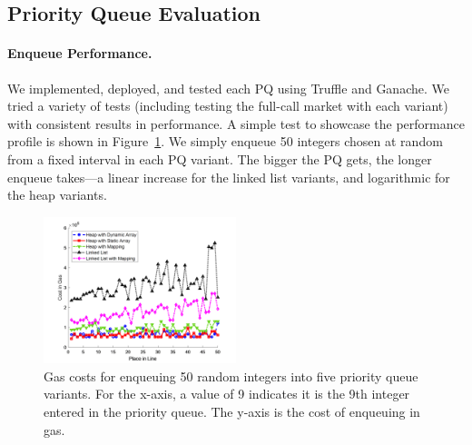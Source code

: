 
\subsection{Priority Queue Evaluation} 

\paragraph{Enqueue Performance.} We implemented, deployed, and tested each PQ using Truffle and Ganache. We tried a variety of tests (including testing the full-call market with each variant) with consistent results in performance. A simple test to showcase the performance profile is shown in Figure~\ref{fig:random_insertion}. We simply enqueue 50 integers chosen at random from a fixed interval in each PQ variant. The bigger the PQ gets, the longer enqueue takes---a linear increase for the linked list variants, and logarithmic for the heap variants. 



\begin{figure}[t]
\centering
\includegraphics[width=0.5\textwidth]{fig/random_insertion3.png}
\caption{Gas costs for enqueuing 50 random integers into five priority queue variants. For the x-axis, a value of 9 indicates it is the 9th integer entered in the priority queue. The y-axis is the cost of enqueuing in gas.  \label{fig:random_insertion}}
\end{figure}






